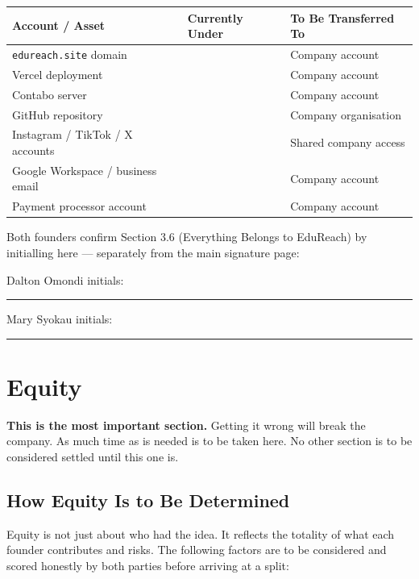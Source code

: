 \documentclass[12pt,a4paper]{article}
\newcommand{\blank}[1][5.5cm]{\underline{\hspace{#1}}}
\begin{document}
\begin{tabularx}{\linewidth}{L{4.5cm} L{3.5cm} X}
  \toprule
  \textbf{Account / Asset} & \textbf{Currently Under} & \textbf{To Be Transferred To} \\
  \midrule
  \texttt{edureach.site} domain        & \blank[3cm] & Company account \\[0.3em]
  Vercel deployment                    & \blank[3cm] & Company account \\[0.3em]
  Contabo server                       & \blank[3cm] & Company account \\[0.3em]
  GitHub repository                    & \blank[3cm] & Company organisation \\[0.3em]
  Instagram / TikTok / X accounts      & \blank[3cm] & Shared company access \\[0.3em]
  Google Workspace / business email    & \blank[3cm] & Company account \\[0.3em]
  Payment processor account            & \blank[3cm] & Company account \\
  \bottomrule
\end{tabularx}

\medskip
\noindent Both founders confirm Section 3.6 (Everything Belongs to EduReach) by initialling here --- separately from the main signature page:

\medskip
\noindent Dalton Omondi initials: \rule{4cm}{0.4pt} \hspace{2cm} Mary Syokau initials: \rule{4cm}{0.4pt}

\section{Equity}

\begin{warnbox}
\textbf{This is the most important section.} Getting it wrong will break the company. As much time as is needed is to be taken here. No other section is to be considered settled until this one is.
\end{warnbox}

\subsection{How Equity Is to Be Determined}

Equity is not just about who had the idea. It reflects the totality of what each founder contributes and risks. The following factors are to be considered and scored honestly by both parties before arriving at a split:
\end{document}

